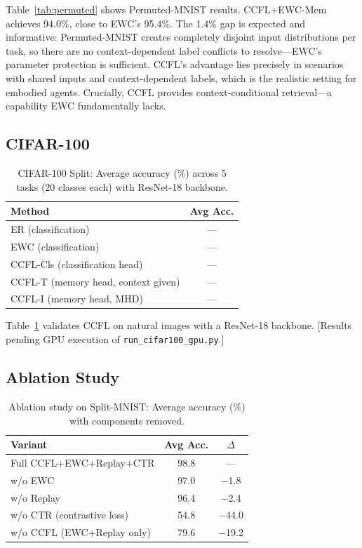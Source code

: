 \documentclass[letterpaper, 10pt, times]{article}
\begin{document}
Table~\ref{tab:permuted} shows Permuted-MNIST results. CCFL+EWC-Mem achieves 94.0\%, close to EWC's 95.4\%. The 1.4\% gap is expected and informative: Permuted-MNIST creates completely disjoint input distributions per task, so there are no context-dependent label conflicts to resolve---EWC's parameter protection is sufficient. CCFL's advantage lies precisely in scenarios with shared inputs and context-dependent labels, which is the realistic setting for embodied agents. Crucially, CCFL provides context-conditional retrieval---a capability EWC fundamentally lacks.

\subsection{CIFAR-100}

\begin{table}[t]
\centering
\caption{CIFAR-100 Split: Average accuracy (\%) across 5 tasks (20 classes each) with ResNet-18 backbone.}
\label{tab:cifar100}
\begin{tabular}{lc}
\toprule
Method & Avg Acc. \\
\midrule
ER (classification) & --- \\
EWC (classification) & --- \\
CCFL-Cls (classification head) & --- \\
CCFL-T (memory head, context given) & --- \\
CCFL-I (memory head, MHD) & --- \\
\bottomrule
\end{tabular}
\end{table}

Table~\ref{tab:cifar100} validates CCFL on natural images with a ResNet-18 backbone. [Results pending GPU execution of \texttt{run\_cifar100\_gpu.py}.]

\subsection{Ablation Study}
\label{sec:ablation}

\begin{table}[t]
\centering
\caption{Ablation study on Split-MNIST: Average accuracy (\%) with components removed.}
\label{tab:ablation}
\begin{tabular}{lcc}
\toprule
Variant & Avg Acc. & $\Delta$ \\
\midrule
Full CCFL+EWC+Replay+CTR & 98.8 & --- \\
w/o EWC & 97.0 & $-$1.8 \\
w/o Replay & 96.4 & $-$2.4 \\
w/o CTR (contrastive loss) & 54.8 & $-$44.0 \\
w/o CCFL (EWC+Replay only) & 79.6 & $-$19.2 \\
\bottomrule
\end{tabular}
\end{table}
\end{document}
